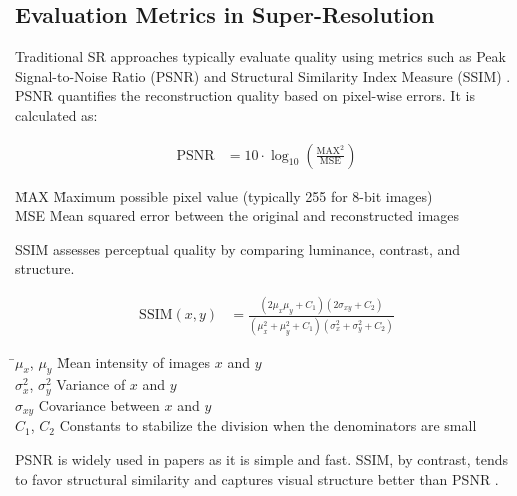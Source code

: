 \documentclass{article} %
\begin{document}
\subsection{Evaluation Metrics in Super-Resolution}

Traditional SR approaches typically evaluate quality using metrics such as Peak Signal-to-Noise Ratio (PSNR) and Structural Similarity Index Measure (SSIM) \citep{huynh2008scope, wang2004image}. PSNR quantifies the reconstruction quality based on pixel-wise errors. It is calculated as:

\begin{align}
\text{PSNR} &= 10 \cdot \log_{10} \left( \frac{\text{MAX}^2}{\text{MSE}} \right)
\end{align}

\vspace{-0.5em}
\begin{tabbing}
\hspace{2.5em}\=MAX \quad\= Maximum possible pixel value (typically 255 for 8-bit images) \\
\>MSE \> Mean squared error between the original and reconstructed images
\end{tabbing}

\vspace{1em}
SSIM assesses perceptual quality by comparing luminance, contrast, and structure.

\begin{align}
\text{SSIM}(x, y) &= \frac{(2\mu_x \mu_y + C_1)(2\sigma_{xy} + C_2)}{(\mu_x^2 + \mu_y^2 + C_1)(\sigma_x^2 + \sigma_y^2 + C_2)}
\end{align}

\vspace{-0.5em}
\begin{tabbing}
\hspace{2.5em}\=$\mu_x$, $\mu_y$ \quad\= Mean intensity of images $x$ and $y$ \\
\>$\sigma_x^2$, $\sigma_y^2$ \> Variance of $x$ and $y$ \\
\>$\sigma_{xy}$ \> Covariance between $x$ and $y$ \\
\>$C_1$, $C_2$ \> Constants to stabilize the division when the denominators are small
\end{tabbing}


PSNR is widely used in papers as it is simple and fast. SSIM, by contrast, tends to favor structural similarity and captures visual structure better than PSNR \citep{wang2004image}.
\end{document}

